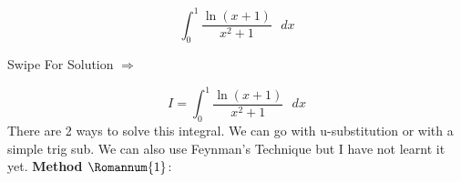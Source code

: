 \documentclass{article}
\begin{document}
\pagecolor{Chalkboard Green}
\Huge
\begin{equation}
    \int_{0}^{1}\frac{\ln{(x+1)}}{x^{2}+1} \text{ $dx$} \nonumber
\end{equation}
\newline 
\begin{center}
Swipe For Solution $\Rightarrow$  
\end{center}
\newpage
\normalsize
\begin{equation}
I = \int_{0}^{1}\frac{\ln{(x+1)}}{x^{2}+1} \text{ $dx$} \nonumber
\end{equation}
\newline
There are 2 ways to solve this integral. We can go with u-substitution or with a simple trig sub. We can also use Feynman's Technique but I have not learnt it yet.
\newline
\newline
\textbf{Method $\Romannum{1}$}:
\end{document}
